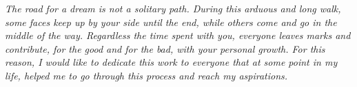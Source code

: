 


\tableofcontents*
\cleardoublepage

\begin{dedicatoria}
    \vspace*{\fill}
    \centering
    \noindent
    \textit{The road for a dream is not a solitary path. During this arduous and long walk, some faces keep up by your side until the end, while others come and go in the middle of the way. Regardless the time spent with you, everyone leaves marks and contribute, for the good and for the bad, with your personal growth. For this reason, I would like to dedicate this work to everyone that at some point in my life, helped me to go through this process and reach my aspirations.} 
    
    \vspace*{\fill}
\end{dedicatoria}

